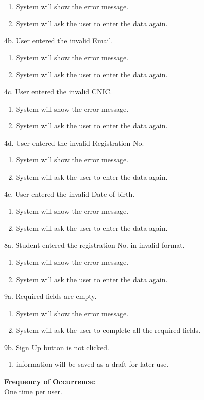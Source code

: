\begin{enumerate}
\item System will show the error message.
\item System will ask the user to enter the data again.
\end{enumerate}
4b. User entered the invalid Email.
\begin{enumerate}
\item System will show the error message.
\item System will ask the user to enter the data again.
\end{enumerate}
4c. User entered the invalid CNIC.
\begin{enumerate}
\item System will show the error message.
\item System will ask the user to enter the data again.
\end{enumerate}
4d. User entered the invalid Registration No.
\begin{enumerate}
\item System will show the error message.
\item System will ask the user to enter the data again.
\end{enumerate}
4e. User entered the invalid Date of birth.
\begin{enumerate}
\item System will show the error message.
\item System will ask the user to enter the data again.
\end{enumerate}
8a. Student entered the registration No. in invalid format.
\begin{enumerate}
\item System will show the error message.
\item System will ask the user to enter the data again.
\end{enumerate}
9a. Required fields are empty.
\begin{enumerate}
\item System will show the error message.
\item System will ask the user to complete all the required fields.
\end{enumerate}
9b. Sign Up button is not clicked.
\begin{enumerate}
\item information will be saved as a draft for later use.
\end{enumerate}
\textbf{Frequency of Occurrence:}\\
One time per user.



